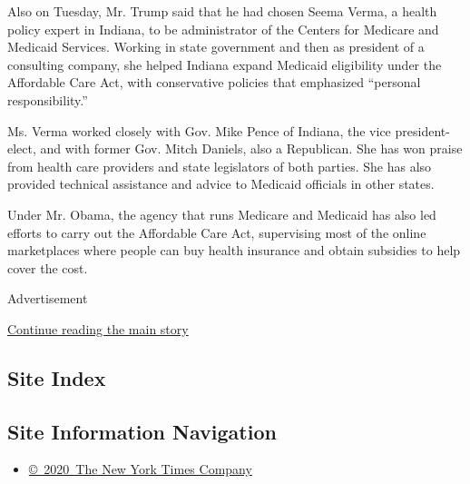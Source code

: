 Also on Tuesday, Mr. Trump said that he had chosen Seema Verma, a health
policy expert in Indiana, to be administrator of the Centers for
Medicare and Medicaid Services. Working in state government and then as
president of a consulting company, she helped Indiana expand Medicaid
eligibility under the Affordable Care Act, with conservative policies
that emphasized ``personal responsibility.''

Ms. Verma worked closely with Gov. Mike Pence of Indiana, the vice
president-elect, and with former Gov. Mitch Daniels, also a Republican.
She has won praise from health care providers and state legislators of
both parties. She has also provided technical assistance and advice to
Medicaid officials in other states.

Under Mr. Obama, the agency that runs Medicare and Medicaid has also led
efforts to carry out the Affordable Care Act, supervising most of the
online marketplaces where people can buy health insurance and obtain
subsidies to help cover the cost.

Advertisement

\protect\hyperlink{after-bottom}{Continue reading the main story}

\hypertarget{site-index}{%
\subsection{Site Index}\label{site-index}}

\hypertarget{site-information-navigation}{%
\subsection{Site Information
Navigation}\label{site-information-navigation}}

\begin{itemize}
\tightlist
\item
  \href{https://help.nytimes.com/hc/en-us/articles/115014792127-Copyright-notice}{©~2020~The
  New York Times Company}
\end{itemize}

